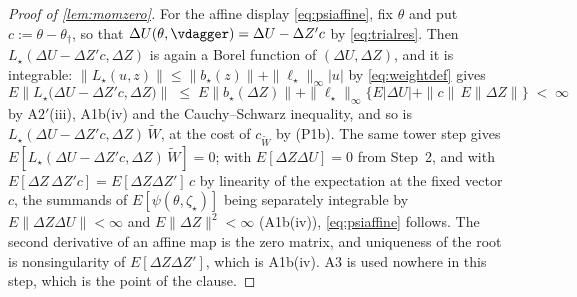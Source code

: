 \begin{proof}[Proof of \cref{lem:momzero}]
For the affine display \eqref{eq:psiaffine}, fix $\theta$ and put $c:=\theta-\theta_\dagger$, so that
$\Delta U(\theta,\vdagger)=\Delta U-\Delta Z'c$ by \eqref{eq:trialres}. Then
$L_\star(\Delta U-\Delta Z'c,\Delta Z)$ is again a Borel function of $(\Delta U,\Delta Z)$, and it is
integrable: $\|L_\star(u,z)\|\le\|b_\star(z)\|+\|\ell_\star\|_\infty|u|$ by \eqref{eq:weightdef} gives
\[
E\big\|L_\star\big(\Delta U-\Delta Z'c,\Delta Z\big)\big\|
\;\le\;E\big\|b_\star(\Delta Z)\big\|+\|\ell_\star\|_\infty\Big\{E|\Delta U|+\|c\|\,E\|\Delta Z\|\Big\}\;<\;\infty
\]
by A$2'$(iii), A1b(iv) and the Cauchy--Schwarz inequality, and so is
$L_\star(\Delta U-\Delta Z'c,\Delta Z)\,\widetilde W$, at the cost of $c_{\widetilde W}$ by
\textup{(P1b)}. The same tower step gives
$E[L_\star(\Delta U-\Delta Z'c,\Delta Z)\,\widetilde W]=0$; with $E[\Delta Z\Delta U]=0$ from Step~2, and
with $E[\Delta Z\,\Delta Z'c]=E[\Delta Z\Delta Z']\,c$ by linearity of the expectation at the fixed vector
$c$, the summands of $E[\psi(\theta,\zeta_\star)]$ being separately integrable by
$E\|\Delta Z\Delta U\|<\infty$ and $E\|\Delta Z\|^{2}<\infty$ (A1b(iv)),
\eqref{eq:psiaffine} follows. The second derivative of an affine map is the zero matrix, and uniqueness of
the root is nonsingularity of $E[\Delta Z\Delta Z']$, which is A1b(iv). A3 is used nowhere in this
step, which is the point of the clause.


\end{proof}
